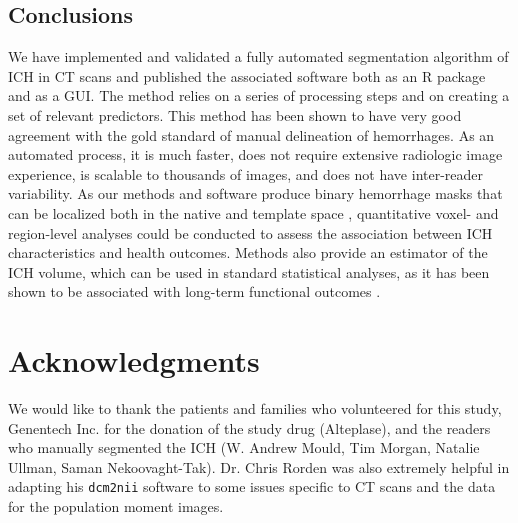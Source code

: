 \documentclass{elsarticle_nonatbib}\usepackage[]{graphicx}\usepackage[]{color}
\newcommand{\code}[1]{\texttt{#1}}
\begin{document}


\subsection{Conclusions}
We have implemented and validated a fully automated segmentation algorithm of ICH in CT scans and published the associated software both as an R package and as a GUI.  The method relies on a series of processing steps and on creating a set of relevant predictors.  This method has been shown to have very good agreement with the gold standard of manual delineation of hemorrhages.  As an automated process, it is much faster, does not require extensive radiologic image experience, is scalable to thousands of images, and does not have inter-reader variability.  As our methods and software produce binary hemorrhage masks that can be localized both in the native and template space \citep{muschelli2015quantitative}, quantitative voxel- and region-level analyses could be conducted to assess the association between ICH characteristics and health outcomes.  Methods also provide an estimator of the ICH volume, which can be used in standard statistical analyses, as it has been shown to be associated with long-term functional outcomes \citep{broderick_volume_1993, jordan2009intracerebral, tuhrim_volume_1999}.


\section*{Acknowledgments}
We would like to thank the patients and families who volunteered for this study, Genentech Inc. for the donation of the study drug (Alteplase), and the readers who manually segmented the ICH (W. Andrew Mould, Tim Morgan, Natalie Ullman, Saman Nekoovaght-Tak).  Dr. Chris Rorden was also extremely helpful in adapting his \code{dcm2nii} software to some issues specific to CT scans and the data for the population moment images.
\end{document}
